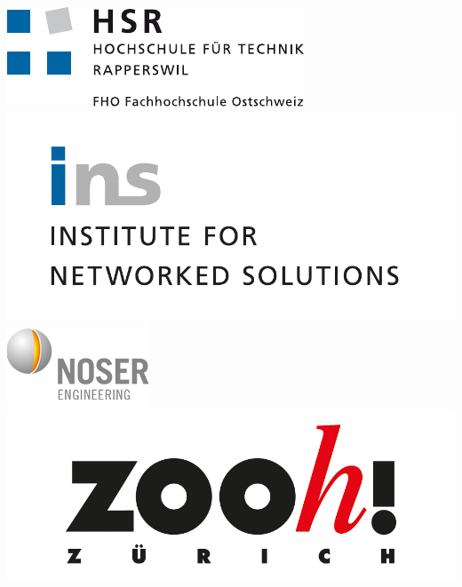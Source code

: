 \begin{titlepage}
\thispagestyle{empty}

\newcommand\thesisAuthorA{Marcel Hess}
\newcommand\thesisAuthorB{Thomas Kistler}
\newcommand\thesisTitle{2Do}
\newcommand\thesisSubject{Bachelorarbeit}
\newcommand\thesisUniversity{Hochschule für Technik Rapperswil}
\newcommand\thesisDepartment{Abteilung Informatik}
\newcommand\thesisAdvisor{2Do}
\newcommand\thesisPartner{2Do}
\newcommand\thesisPeriod{Frühlingssemester 2020}
\newcommand\thesisExpert{Max Mustermann}
\newcommand\thesisReader{Prof. Dr. XYZ}


    \includegraphics[height=0.08\textheight]{images/logo_hsr.pdf}
    \hspace{50mm}
    \includegraphics[height=0.1\textheight]{images/ins_institute.pdf}\\[5mm]
    \includegraphics{images/noser.png}
    \hspace{64mm}
    \includegraphics[scale=0.2]{images/zoo.png}\\[10mm]


\end{titlepage}
